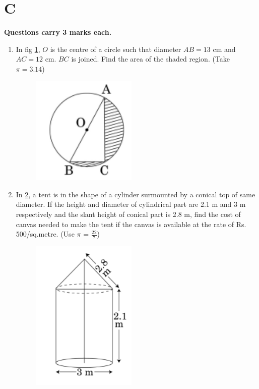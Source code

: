 \documentclass[book,11pt,onecolumn]{IEEEtran}
\renewcommand\thesection{\arabic{section}}
\begin{document}
\section{\textbf{C}}
\textbf{Questions carry 3 marks each.} \\
\begin{enumerate}[label=\thesection.\arabic*.,ref=\thesection.\theenumi]
\item  In fig \ref{figure_4}, $O$ is the centre of a circle such that diameter $AB = 13$ cm and $AC = 12$ cm. $BC$ is joined. Find the area of the shaded region. (Take $\pi = 3.14$)\\

	\begin{figure}[H]
      \centering
      \includegraphics[width=5cm]{figs/4.png}
      \caption{}
      \label{figure_4}
\end{figure} 

\item  In \ref{figure_5}, a tent is in the shape of a cylinder surmounted by a conical top of same diameter. If the height and diameter of cylindrical part are 2.1 m and 3 m respectively and the slant height of conical part is 2.8 m, find the cost of canvas needed to make the tent if the canvas is available at the rate of Rs. 500/sq.metre. (Use $\pi$ = $\frac{22}{7}$)\\
	\begin{figure}[H]
      \centering
      \includegraphics[width=5cm]{figs/5.png}
      \caption{}
      \label{figure_5}
\end{figure} 


\end{enumerate}
\end{document}
